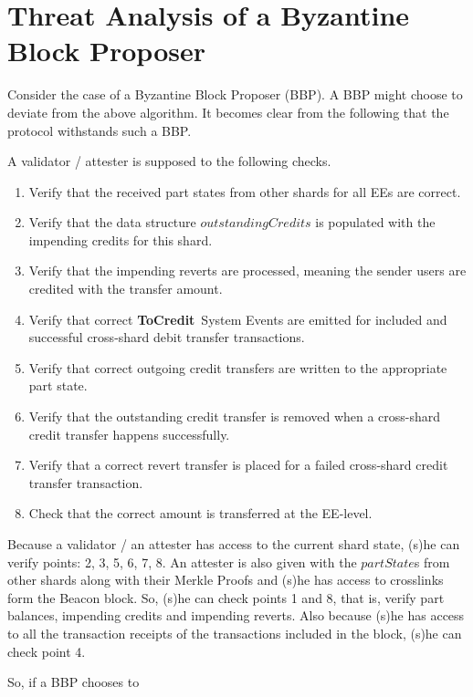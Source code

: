 \documentclass{IEEEtran}
\newcommand{\tocredit}[0]{{\bf ToCredit}~}
\begin{document}
\section{Threat Analysis of a Byzantine Block Proposer}
\label{sec:threat}
Consider the case of a Byzantine Block Proposer (BBP). A BBP might choose to deviate from the above algorithm. It becomes clear from the following that the protocol withstands such a BBP.

A validator / attester is supposed to the following checks.
\begin{enumerate}
\item Verify that the received part states from other shards for all EEs are correct.
\item Verify that the data structure $outstandingCredits$ is populated with the impending credits for this shard.
\item Verify that the impending reverts are processed, meaning the sender users are credited with the transfer amount.
\item Verify that correct \tocredit System Events are emitted for included and successful cross-shard debit transfer transactions.
\item Verify that correct outgoing credit transfers are written to the appropriate part state.
\item Verify that the outstanding credit transfer is removed when a cross-shard credit transfer happens successfully.
\item Verify that a correct revert transfer is placed for a failed cross-shard credit transfer transaction.
\item Check that the correct amount is transferred at the EE-level.
\end{enumerate}

Because a validator / an attester has access to the current shard state, (s)he can verify points: 2, 3, 5, 6, 7, 8. An attester is also given with the $partState$s from other shards along with their Merkle Proofs and (s)he has access to crosslinks form the Beacon block. So, (s)he can check points 1 and 8, that is, verify part balances, impending credits and impending reverts. Also because (s)he has access to all the transaction receipts of the transactions included in the block, (s)he can check point 4.

So, if a BBP chooses to
\end{document}
